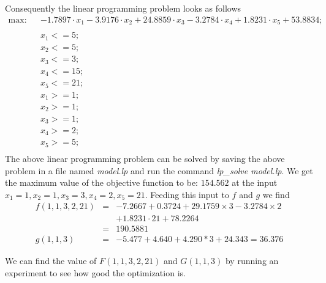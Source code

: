 \documentclass[12pt]{article}
\begin{document}
 Consequently the linear programming problem looks as follows
\begin{eqnarray*}
\text{max:} & & -1.7897 \cdot x_1 - 3.9176 \cdot x_2 + 24.8859 \cdot x_3 - 3.2784 \cdot x_4 + 1.8231 \cdot x_5 + 53.8834;\\
\\
& & x_1 <= 5;\\
& & x_2 <= 5;\\
& & x_3 <= 3;\\
& & x_4 <= 15;\\
& & x_5 <= 21;\\
& & x_1 >= 1;\\
& & x_2 >= 1;\\
& & x_3 >= 1;\\
& & x_4 >= 2;\\
& & x_5 >= 5;\\
\end{eqnarray*}
The above linear programming problem can be solved by saving the above problem in a file named \textit{model.lp} and run the command \textit{lp\_solve model.lp}. We get the maximum value of the objective function to be: $154.562$ at the input $x_1 = 1,x_2 = 1,x_3 = 3, x_4 = 2, x_5 = 21$. Feeding this input to $f$ and $g$ we find
\begin{eqnarray*}
f(1,1,3,2,21) &=& -7.2667 + 0.3724 + 29.1759 \times 3 - 3.2784 \times 2\\
& & + 1.8231 \cdot 21 + 78.2264\\
&=& 190.5881\\
g(1,1,3) &=& -5.477 + 4.640 + 4.290 * 3 + 24.343 = 36.376
\end{eqnarray*}

We can find the value of $F(1,1,3,2,21)$ and $G(1,1,3)$ by running an experiment to see how good the optimization is.
\end{document}
